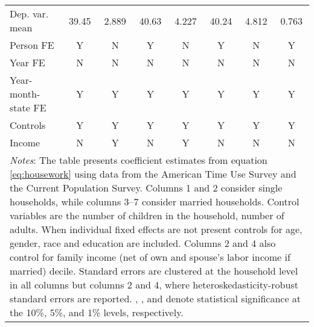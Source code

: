 {\begin{tabular}{l*{7}{c}}
Dep. var. mean      &       39.45         &       2.889         &       40.63         &       4.227         &       40.24         &       4.812         &       0.763         \\
Person FE           &           Y         &           N         &           Y         &           N         &           Y         &           N         &           Y         \\
Year FE             &           N         &           N         &           N         &           N         &           N         &           N         &           N         \\
Year-month-state FE &           Y         &           Y         &           Y         &           Y         &           Y         &           Y         &           Y         \\
Controls            &           Y         &           Y         &           Y         &           Y         &           Y         &           Y         &           Y         \\
Income              &           N         &           Y         &           N         &           Y         &           N         &           N         &           N         \\
\bottomrule
\multicolumn{8}{p{17cm}}{\footnotesize \textit{Notes}: The table presents coefficient estimates from equation \ref{eq:housework} using data from the American Time Use Survey and the Current Population Survey. Columns 1 and 2 consider single households, while columns 3--7 consider married households. Control variables are the number of children in the household, number of adults. When individual fixed effects are not present controls for age, gender, race and education are included. Columns 2 and 4 also control for family income (net of own and spouse's labor income if married) decile. Standard errors are clustered at the household level in all columns but columns 2 and 4, where heteroskedasticity-robust standard errors are reported. \sym{*}, \sym{**}, and \sym{***} denote statistical significance at the 10\%, 5\%, and 1\% levels, respectively.}\\
\end{tabular}
}
